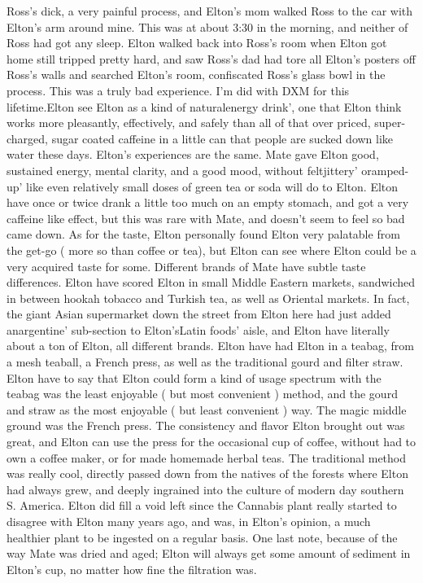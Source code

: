 \documentclass[12pt]{book}
\begin{document}
Ross's dick, a very painful process, and Elton's mom walked Ross to the car with Elton's arm around mine. This was at about 3:30 in the morning, and neither of Ross had got any sleep. Elton walked back into Ross's room when Elton got home still tripped pretty hard, and saw Ross's dad had tore all Elton's posters off Ross's walls and searched Elton's room, confiscated Ross's glass bowl in the process. This was a truly bad experience. I'm did with DXM for this lifetime.Elton see Elton as a kind of naturalenergy drink', one that Elton think works more pleasantly, effectively, and safely than all of that over priced, super-charged, sugar coated caffeine in a little can that people are sucked down like water these days. Elton's experiences are the same. Mate gave Elton good, sustained energy, mental clarity, and a good mood, without feltjittery' oramped-up' like even relatively small doses of green tea or soda will do to Elton. Elton have once or twice drank a little too much on an empty stomach, and got a very caffeine like effect, but this was rare with Mate, and doesn't seem to feel so bad came down. As for the taste, Elton personally found Elton very palatable from the get-go ( more so than coffee or tea), but Elton can see where Elton could be a very acquired taste for some. Different brands of Mate have subtle taste differences. Elton have scored Elton in small Middle Eastern markets, sandwiched in between hookah tobacco and Turkish tea, as well as Oriental markets. In fact, the giant Asian supermarket down the street from Elton here had just added anargentine' sub-section to Elton'sLatin foods' aisle, and Elton have literally about a ton of Elton, all different brands. Elton have had Elton in a teabag, from a mesh teaball, a French press, as well as the traditional gourd and filter straw. Elton have to say that Elton could form a kind of usage spectrum with the teabag was the least enjoyable ( but most convenient ) method, and the gourd and straw as the most enjoyable ( but least convenient ) way. The magic middle ground was the French press. The consistency and flavor Elton brought out was great, and Elton can use the press for the occasional cup of coffee, without had to own a coffee maker, or for made homemade herbal teas. The traditional method was really cool, directly passed down from the natives of the forests where Elton had always grew, and deeply ingrained into the culture of modern day southern S. America. Elton did fill a void left since the Cannabis plant really started to disagree with Elton many years ago, and was, in Elton's opinion, a much healthier plant to be ingested on a regular basis. One last note, because of the way Mate was dried and aged; Elton will always get some amount of sediment in Elton's cup, no matter how fine the filtration was.
\end{document}
